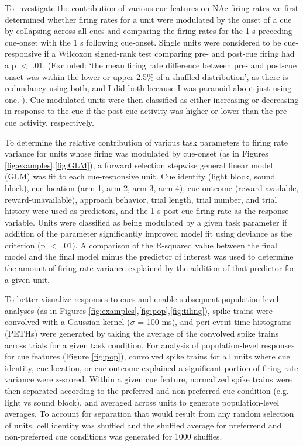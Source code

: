 \documentclass[11pt]{article}
\begin{document}
To investigate the contribution of various cue features on NAc firing rates we first determined whether firing rates for a unit were modulated by the onset of a cue by collapsing across all cues and comparing the firing rates for the 1 s preceding cue-onset with the 1 s following cue-onset. Single units were considered to be cue-responsive if a Wilcoxon signed-rank test comparing pre- and post-cue firing had a p $<$ .01. (Excluded: ‘the mean firing rate difference between pre- and post-cue onset was within the lower or upper 2.5\% of a shuffled distribution’, as there is redundancy using both, and I did both because I was paranoid about just using one. ). Cue-modulated units were then classified as either increasing or decreasing in response to the cue if the post-cue activity was higher or lower than the pre-cue activity, respectively.

To determine the relative contribution of various task parameters to firing rate variance for units whose firing was modulated by cue-onset (as in Figures \ref{fig:examples},\ref{fig:GLM}), a forward selection stepwise general linear model (GLM) was fit to each cue-responsive unit. Cue identity (light block, sound block), cue location (arm 1, arm 2, arm 3, arm 4), cue outcome (reward-available, reward-unavailable), approach behavior, trial length, trial number, and trial history were used as predictors, and the 1 s post-cue firing rate as the response variable. Units were classified as being modulated by a given task parameter if addition of the parameter significantly improved model fit using deviance as the criterion (p $<$ .01). A comparison of the R-squared value between the final model and the final model minus the predictor of interest was used to determine the amount of firing rate variance explained by the addition of that predictor for a given unit.

To better visualize responses to cues and enable subsequent population level analyses (as in Figures \ref{fig:examples},\ref{fig:pop},\ref{fig:tiling}), spike trains were convolved with a Gaussian kernel ($\sigma$ = 100 ms), and peri-event time histograms (PETHs) were generated by taking the average of the convolved spike trains across trials for a given task condition. For analysis of population-level responses for cue features (Figure \ref{fig:pop}), convolved spike trains for all units where cue identity, cue location, or cue outcome explained a significant portion of firing rate variance were z-scored. Within a given cue feature, normalized spike trains were then separated according to the preferred and non-preferred cue condition (e.g. light vs sound block), and averaged across units to generate population-level averages. To account for separation that would result from any random selection of units, cell identity was shuffled and the shuffled average for preferrend and non-preferred cue conditions was generated for 1000 shuffles.
\end{document}
